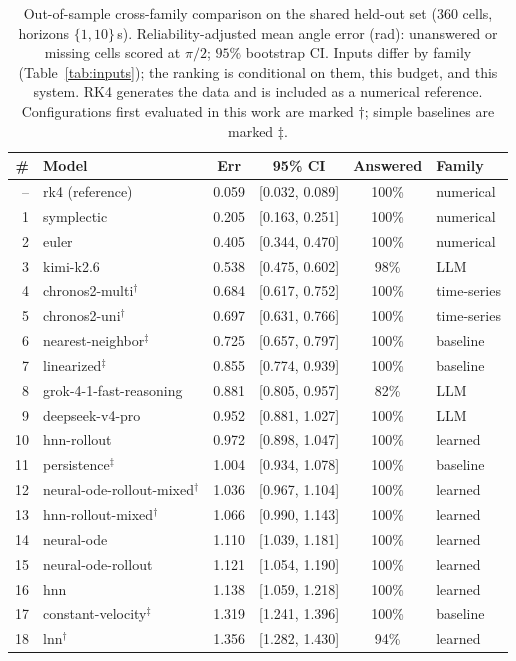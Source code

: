 \documentclass{article}
\begin{document}
\begin{table}[tbp]
\centering\footnotesize\renewcommand{\arraystretch}{0.74}
\caption{Out-of-sample cross-family comparison on the shared held-out set ($360$ cells, horizons
$\{1,10\}$\,s). Reliability-adjusted mean angle error (rad): unanswered or missing cells
scored at $\pi/2$; $95\%$ bootstrap CI. Inputs differ by family (Table~\ref{tab:inputs}); the
ranking is conditional on them, this budget, and this system. RK4 generates the data and is
included as a numerical reference. Configurations first evaluated in this work are marked $\dagger$;
simple baselines are marked $\ddagger$.}\label{tab:overall}
\begin{tabular}{rlcccl}
\toprule
\# & Model & Err & 95\% CI & Answered & Family \\
\midrule
-- & rk4 (reference) & 0.059 & [0.032, 0.089] & 100\% & numerical \\
1 & symplectic & 0.205 & [0.163, 0.251] & 100\% & numerical \\
2 & euler & 0.405 & [0.344, 0.470] & 100\% & numerical \\
3 & kimi-k2.6 & 0.538 & [0.475, 0.602] & 98\% & LLM \\
4 & chronos2-multi$^\dagger$ & 0.684 & [0.617, 0.752] & 100\% & time-series \\
5 & chronos2-uni$^\dagger$ & 0.697 & [0.631, 0.766] & 100\% & time-series \\
6 & nearest-neighbor$^\ddagger$ & 0.725 & [0.657, 0.797] & 100\% & baseline \\
7 & linearized$^\ddagger$ & 0.855 & [0.774, 0.939] & 100\% & baseline \\
8 & grok-4-1-fast-reasoning & 0.881 & [0.805, 0.957] & 82\% & LLM \\
9 & deepseek-v4-pro & 0.952 & [0.881, 1.027] & 100\% & LLM \\
10 & hnn-rollout & 0.972 & [0.898, 1.047] & 100\% & learned \\
11 & persistence$^\ddagger$ & 1.004 & [0.934, 1.078] & 100\% & baseline \\
12 & neural-ode-rollout-mixed$^\dagger$ & 1.036 & [0.967, 1.104] & 100\% & learned \\
13 & hnn-rollout-mixed$^\dagger$ & 1.066 & [0.990, 1.143] & 100\% & learned \\
14 & neural-ode & 1.110 & [1.039, 1.181] & 100\% & learned \\
15 & neural-ode-rollout & 1.121 & [1.054, 1.190] & 100\% & learned \\
16 & hnn & 1.138 & [1.059, 1.218] & 100\% & learned \\
17 & constant-velocity$^\ddagger$ & 1.319 & [1.241, 1.396] & 100\% & baseline \\
18 & lnn$^\dagger$ & 1.356 & [1.282, 1.430] & 94\% & learned \\
\bottomrule
\end{tabular}
\end{table}
\end{document}
